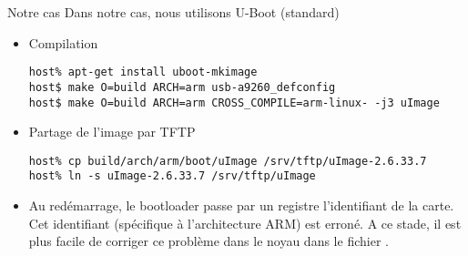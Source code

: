\begin{frame}[fragile=singleslide]{Notre cas}
  Dans notre cas, nous utilisons U-Boot (standard)
  \begin{itemize}
  \item Compilation
    \begin{lstlisting}
host% apt-get install uboot-mkimage
host$ make O=build ARCH=arm usb-a9260_defconfig
host$ make O=build ARCH=arm CROSS_COMPILE=arm-linux- -j3 uImage
    \end{lstlisting}
  \item Partage de l'image par TFTP
    \begin{lstlisting}
host% cp build/arch/arm/boot/uImage /srv/tftp/uImage-2.6.33.7
host% ln -s uImage-2.6.33.7 /srv/tftp/uImage
    \end{lstlisting} %
  \item  Au   redémarrage,  le   bootloader  passe  par   un  registre
    l'identifiant  de   la  carte.   Cet   identifiant  (spécifique  à
    l'architecture ARM) est erroné. A  ce stade, il est plus facile de
    corriger   ce   problème   dans   le   noyau   dans   le   fichier
    .
  \end{itemize}
\end{frame}


